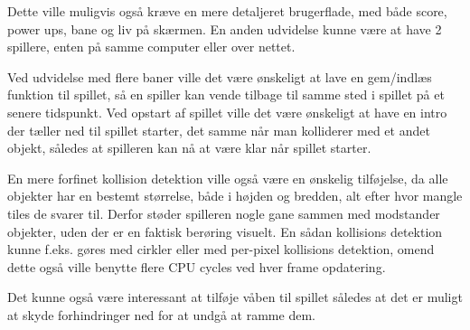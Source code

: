 Dette ville muligvis også kræve en mere detaljeret brugerflade, med både score, power ups, bane og liv på skærmen. En anden udvidelse kunne være at have 2 spillere, enten på samme computer eller over nettet.

Ved udvidelse med flere baner ville det være ønskeligt at lave en gem/indlæs funktion til spillet, så en spiller kan vende tilbage til samme sted i spillet på et senere tidspunkt. Ved opstart af spillet ville det være ønskeligt at have en intro der tæller ned til spillet starter, det samme når man kolliderer med et andet objekt, således at spilleren kan nå at være klar når spillet starter.

En mere forfinet kollision detektion ville også være en ønskelig tilføjelse, da alle objekter har en bestemt størrelse, både i højden og bredden, alt efter hvor mangle tiles de svarer til. Derfor støder spilleren nogle gane sammen med modstander objekter, uden der er en faktisk berøring visuelt. En sådan kollisions detektion kunne f.eks. gøres med cirkler eller med per-pixel kollisions detektion, omend dette også ville benytte flere CPU cycles ved hver frame opdatering.

Det kunne også være interessant at tilføje våben til spillet således at det er muligt at skyde forhindringer ned for at undgå at ramme dem.